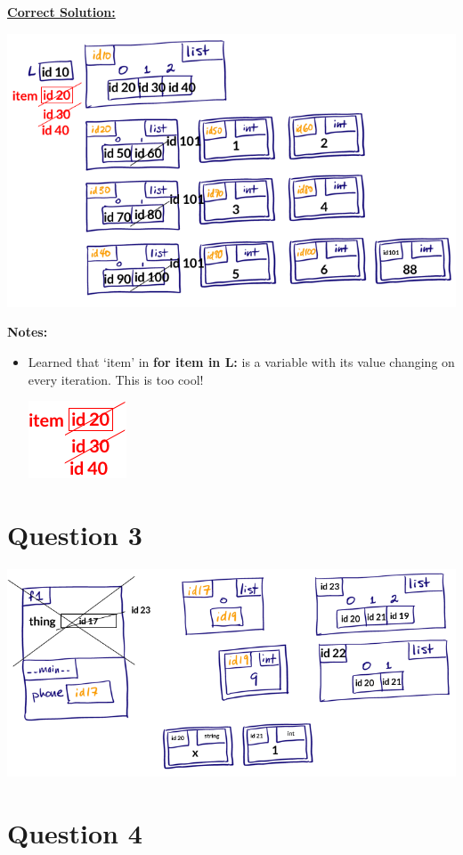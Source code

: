 \documentclass[12pt]{article}
\begin{document}
\begin{mdframed}
    \underline{\textbf{Correct Solution:}}

    \bigskip

    \begin{center}
    \includegraphics[width=0.8 \linewidth]{images/worksheet_1_review_q2_correction.png}
    \end{center}

\end{mdframed}

\bigskip

\textbf{Notes:}

\begin{itemize}
    \item Learned that `item' in \textbf{for item in L:} is a variable with its
    value changing on every iteration. This is too cool!

    \begin{center}
    \includegraphics[width=0.2\linewidth]{images/worksheet_1_review_q2_note.png}
    \end{center}
\end{itemize}

\section*{Question 3}
\begin{center}
\includegraphics[width=0.8\linewidth]{images/worksheet_1_review_q3_solution.png}
\end{center}

\bigskip


\section*{Question 4}
\end{document}
